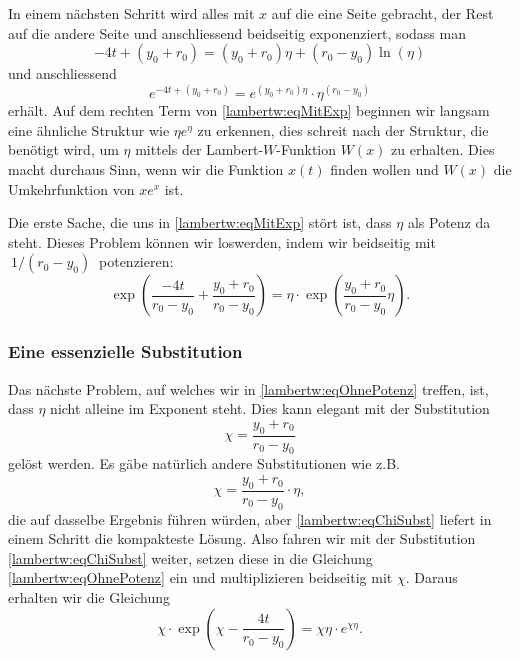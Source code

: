 In einem nächsten Schritt wird alles mit \(x\) auf die eine Seite gebracht, der Rest auf die andere Seite und anschliessend beidseitig exponenziert, sodass man 
\begin{equation}
	-4t+\left(y_0+r_0\right)
	=
	\left(y_0+r_0\right)\eta+\left(r_0-y_0\right)\operatorname{ln}\left(\eta\right)
\end{equation}
und anschliessend
\begin{equation}
	e^{\displaystyle -4t+\left(y_0+r_0\right)}
	=
	e^{\displaystyle \left(y_0+r_0\right)\eta}\cdot\eta^{\displaystyle \left(r_0-y_0\right)}
	\label{lambertw:eqMitExp}
\end{equation}
erhält.
Auf dem rechten Term von \eqref{lambertw:eqMitExp} beginnen wir langsam eine ähnliche Struktur wie \(\eta e^\eta\) zu erkennen, dies schreit nach der Struktur, die benötigt wird, um \(\eta\) mittels der Lambert-\(W\)-Funktion \(W(x)\) zu erhalten. Dies macht durchaus Sinn, wenn wir die Funktion \(x(t)\) finden wollen und \(W(x)\) die Umkehrfunktion von \(x e^x\) ist. 

Die erste Sache, die uns in \eqref{lambertw:eqMitExp} stört ist, dass \(\eta\) als Potenz da steht. Dieses Problem können wir loswerden, indem wir beidseitig mit \(\:1 / (r_0-y_0)\:\) potenzieren:
\begin{equation}
	\operatorname{exp}\left(\displaystyle \frac{-4t}{r_0-y_0}+\frac{y_0+r_0}{r_0-y_0}\right)
	=
	\eta\cdot \operatorname{exp}\left(\displaystyle \frac{y_0+r_0}{r_0-y_0}\eta\right).
	\label{lambertw:eqOhnePotenz}
\end{equation}

\subsubsection{Eine essenzielle Substitution
	\label{lambertw:subsubsection:SubstChi}}
Das nächste Problem, auf welches wir in \eqref{lambertw:eqOhnePotenz} treffen, ist, dass \(\eta\) nicht alleine im Exponent steht. Dies kann elegant mit der Substitution 
\begin{equation}
	\chi
	=
	\frac{y_0+r_0}{r_0-y_0}
	\label{lambertw:eqChiSubst}
\end{equation}
gelöst werden.
Es gäbe natürlich andere Substitutionen wie z.B. 
\[\displaystyle \chi=\frac{y_0+r_0}{r_0-y_0}\cdot\eta,\] 
die auf dasselbe Ergebnis führen würden, aber \eqref{lambertw:eqChiSubst} liefert in einem Schritt die kompakteste Lösung. Also fahren wir mit der Substitution \eqref{lambertw:eqChiSubst} weiter, setzen diese in die Gleichung \eqref{lambertw:eqOhnePotenz} ein und multiplizieren beidseitig mit \(\chi\). Daraus erhalten wir die Gleichung
\begin{equation}
	\chi\cdot \operatorname{exp}\left(\displaystyle \chi-\frac{4t}{r_0-y_0}\right)
	=
	\chi\eta\cdot e^{\displaystyle \chi\eta}.
	\label{lambertw:eqNachSubst}
\end{equation}

